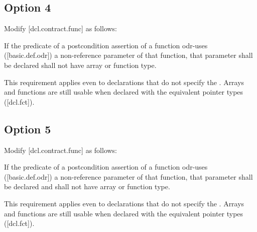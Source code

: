 \subsection{Option 4}

Modify [dcl.contract.func] as follows:

\begin{adjustwidth}{0.5cm}{0.5cm}
If the predicate of a postcondition assertion of a function odr-uses ([basic.def.odr]) a
non-reference parameter of that function, that parameter shall be declared \added{, }shall not have array or function type.
\begin{note}
This requirement applies even to declarations
that do not specify the . Arrays and functions are still usable when declared with the equivalent pointer types ([dcl.fct]).
\end{note}
\begin{example}
\tcode{[...]}
\end{example}
\end{adjustwidth}

\subsection{Option 5}

Modify [dcl.contract.func] as follows:

\begin{adjustwidth}{0.5cm}{0.5cm}
If the predicate of a postcondition assertion of a function odr-uses ([basic.def.odr]) a
non-reference parameter of that function, that parameter shall be declared  and shall not have array or function type.
\begin{note}
This requirement applies even to declarations
that do not specify the . Arrays and functions are still usable when declared with the equivalent pointer types ([dcl.fct]).
\end{note}
\begin{example}
\tcode{[...]}
\end{example}

\end{adjustwidth}

